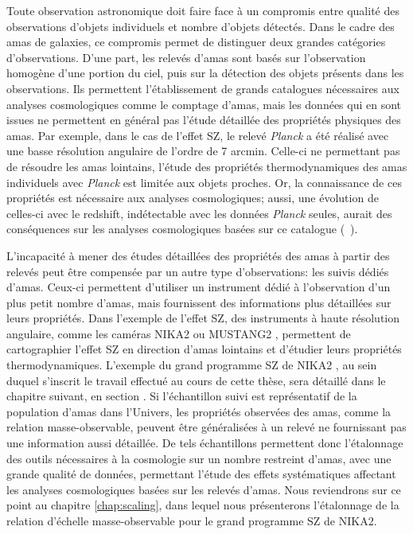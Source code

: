 Toute observation astronomique doit faire face à un compromis entre qualité des observations d'objets individuels et nombre d'objets détectés.
Dans le cadre des amas de galaxies, ce compromis permet de distinguer deux grandes catégories d'observations.
D'une part, les relevés d'amas sont basés sur l'observation homogène d'une portion du ciel, puis sur la détection des objets présents dans les observations.
Ils permettent l'établissement de grands catalogues nécessaires aux analyses cosmologiques comme le comptage d'amas, mais les données qui en sont issues ne permettent en général pas l'étude détaillée des propriétés physiques des amas.
Par exemple, dans le cas de l'effet SZ, le relevé \textit{Planck} \cite{planck_collaboration_planck_2016-2} a été réalisé avec une basse résolution angulaire de l'ordre de 7 arcmin.
Celle-ci ne permettant pas de résoudre les amas lointains, l'étude des propriétés thermodynamiques des amas individuels avec \textit{Planck} est limitée aux objets proches.
Or, la connaissance de ces propriétés est nécessaire aux analyses cosmologiques; aussi, une évolution de celles-ci avec le redshift, indétectable avec les données \textit{Planck} seules, aurait des conséquences sur les analyses cosmologiques basées sur ce catalogue (\eg\ \cite{ruppin_impact_2019}).

L'incapacité à mener des études détaillées des propriétés des amas à partir des relevés peut être compensée par un autre type d'observations: les suivis dédiés d'amas.
Ceux-ci permettent d'utiliser un instrument dédié à l'observation d'un plus petit nombre d'amas, mais fournissent des informations plus détaillées sur leurs propriétés.
Dans l'exemple de l'effet SZ, des instruments à haute résolution angulaire, comme les caméras NIKA2 \cite{adam_nika2_2018,perotto_calibration_2020} ou MUSTANG2 \cite{dicker_mustang2_2014}, permettent de cartographier l'effet SZ en direction d'amas lointains et d'étudier leurs propriétés thermodynamiques.
L'exemple du grand programme SZ de NIKA2 \cite{mayet_cluster_2020}, au sein duquel s'inscrit le travail effectué au cours de cette thèse, sera détaillé dans le chapitre suivant, en section .
Si l'échantillon suivi est représentatif de la population d'amas dans l'Univers, les propriétés observées des amas, comme la relation masse-observable, peuvent être généralisées à un relevé ne fournissant pas une information aussi détaillée.
De tels échantillons permettent donc l'étalonnage des outils nécessaires à la cosmologie sur un nombre restreint d'amas, avec une grande qualité de données, permettant l'étude des effets systématiques affectant les analyses cosmologiques basées sur les relevés d'amas.
Nous reviendrons sur ce point au chapitre \ref{chap:scaling}, dans lequel nous présenterons l'étalonnage de la relation d'échelle masse-observable pour le grand programme SZ de NIKA2.

